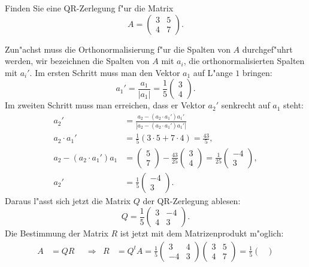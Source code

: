 Finden Sie eine QR-Zerlegung f"ur die Matrix
\[
A=\begin{pmatrix}
3&5\\
4&7
\end{pmatrix}.
\]

\begin{loesung}
Zun"achst muss die Orthonormalisierung f"ur die Spalten von $A$
durchgef"uhrt werden, wir bezeichnen die Spalten von $A$ mit $a_i$,
die orthonormalisierten Spalten mit $a_i'$. Im ersten Schritt muss man
den Vektor $a_1$ auf L"ange $1$ bringen:
\[
a_1'=\frac{a_1}{|a_1|}=\frac15\begin{pmatrix}3\\4\end{pmatrix}.
\]
Im zweiten Schritt muss man erreichen, dass er Vektor $a_2'$ senkrecht
auf $a_1$ steht:
\begin{align*}
a_2'&=\frac{a_2-(a_2\cdot a_1')a_1'}{|a_2-(a_2\cdot a_1')a_1'|}\\
a_2\cdot a_1'&=\frac15(3\cdot 5+7\cdot 4)=\frac{43}{5},\\
a_2-(a_2\cdot a_1')a_1&=
\begin{pmatrix}5\\7\end{pmatrix}
-\frac{43}{25}\begin{pmatrix}3\\4\end{pmatrix}
=\frac{1}{25}\begin{pmatrix}-4\\3\end{pmatrix},
\\
a_2'&=\frac15\begin{pmatrix}-4\\3\end{pmatrix}.
\end{align*}
Daraus l"asst sich jetzt die Matrix $Q$ der QR-Zerlegung ablesen:
\[
Q=\frac15
\begin{pmatrix}
3&-4\\
4& 3
\end{pmatrix}.
\]
Die Bestimmung der Matrix $R$ ist jetzt mit dem Matrizenprodukt m"oglich:
\begin{align*}
A&=QR&&\Rightarrow&R&=Q^tA=\frac15\begin{pmatrix}3&4\\-4&3\end{pmatrix}
\begin{pmatrix}3&5\\4&7\end{pmatrix}
=\frac15\begin{pmatrix}

\end{pmatrix}
\end{align*}
\end{loesung}

